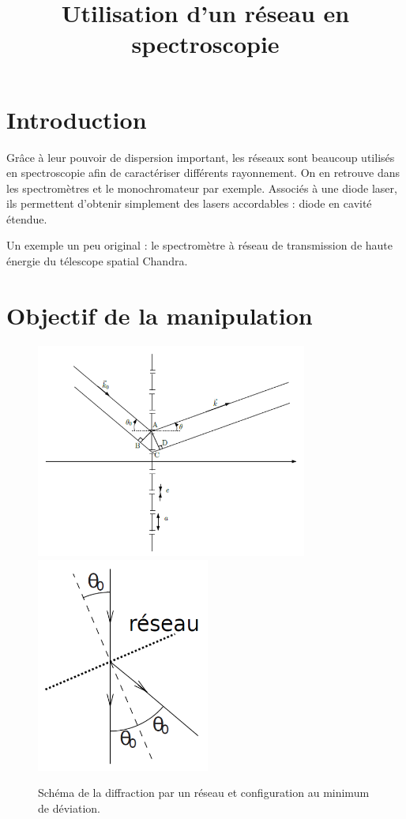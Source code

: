 \documentclass[12pt,a4paper]{article}
\title{Utilisation d'un réseau en spectroscopie}
\begin{document}
\maketitle

\section*{Introduction}

Grâce à leur pouvoir de dispersion important, les réseaux sont beaucoup utilisés en spectroscopie afin de caractériser différents rayonnement.
On en retrouve dans les spectromètres et le monochromateur par exemple.
Associés à une diode laser, ils permettent d'obtenir simplement des lasers accordables : diode en cavité étendue.

Un exemple un peu original : le spectromètre à réseau de transmission de haute énergie du télescope spatial Chandra.

\section{Objectif de la manipulation}

\begin{figure}[!b]
\center
\includegraphics[height=200pt]{reseau.png}
\includegraphics[height=200pt]{reseau_min.png}
\caption{Schéma de la diffraction par un réseau et configuration au minimum de déviation.}
\label{fig:reseau}
\end{figure}
\end{document}
